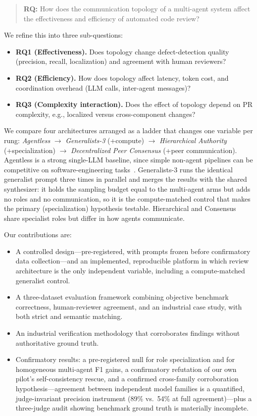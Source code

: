 \documentclass[conference]{IEEEtran}
\begin{document}
\begin{quote}
\textbf{RQ:} How does the communication topology of a multi-agent system
affect the effectiveness and efficiency of automated code review?
\end{quote}

We refine this into three sub-questions:
\begin{itemize}
  \item \textbf{RQ1 (Effectiveness).} Does topology change defect-detection
  quality (precision, recall, localization) and agreement with human
  reviewers?
  \item \textbf{RQ2 (Efficiency).} How does topology affect latency, token
  cost, and coordination overhead (LLM calls, inter-agent messages)?
  \item \textbf{RQ3 (Complexity interaction).} Does the effect of topology
  depend on PR complexity, e.g., localized versus cross-component changes?
\end{itemize}

We compare four architectures arranged as a ladder that changes one variable
per rung: \emph{Agentless} $\rightarrow$ \emph{Generalists-3} (+compute)
$\rightarrow$ \emph{Hierarchical Authority} (+specialization) $\rightarrow$
\emph{Decentralized Peer Consensus} (+peer communication). Agentless is a
strong single-LLM baseline, since simple non-agent pipelines can be
competitive on software-engineering tasks~\cite{agentless}. Generalists-3
runs the identical generalist prompt three times in parallel and merges the
results with the shared synthesizer: it holds the sampling budget equal to
the multi-agent arms but adds no roles and no communication, so it is the
compute-matched control that makes the primary (specialization) hypothesis
testable. Hierarchical and Consensus share specialist roles but differ in
how agents communicate.

Our contributions are:
\begin{itemize}
  \item A controlled design---pre-registered, with prompts frozen before
  confirmatory data collection---and an implemented, reproducible platform
  in which review architecture is the only independent variable, including a
  compute-matched generalist control.
  \item A three-dataset evaluation framework combining objective benchmark
  correctness, human-reviewer agreement, and an industrial case study, with
  both strict and semantic matching.
  \item An industrial verification methodology that corroborates findings
  without authoritative ground truth.
  \item Confirmatory results: a pre-registered null for role
  specialization and for homogeneous multi-agent F1 gains, a confirmatory
  refutation of our own pilot's self-consistency rescue, and a confirmed
  cross-family corroboration hypothesis---agreement between independent
  model families is a quantified, judge-invariant precision instrument
  (89\% vs.\ 54\% at full agreement)---plus a three-judge audit showing
  benchmark ground truth is materially incomplete.
\end{itemize}
\end{document}
